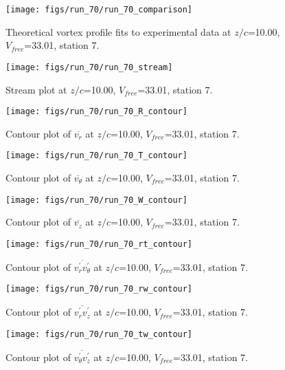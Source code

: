 \begin{figure}[H]
\centering
\texttt{[image: figs/run\_70/run\_70\_comparison]}
\caption{Theoretical vortex profile fits to experimental data at $z/c$=10.00, $V_{free}$=33.01, station 7.}
\end{figure}


\begin{figure}[H]
\centering
\texttt{[image: figs/run\_70/run\_70\_stream]}
\caption{Stream plot at $z/c$=10.00, $V_{free}$=33.01, station 7.}
\end{figure}


\begin{figure}[H]
\centering
\texttt{[image: figs/run\_70/run\_70\_R\_contour]}
\caption{Contour plot of $\overline{v_{r}}$ at $z/c$=10.00, $V_{free}$=33.01, station 7.}
\end{figure}


\begin{figure}[H]
\centering
\texttt{[image: figs/run\_70/run\_70\_T\_contour]}
\caption{Contour plot of $\overline{v_{\theta}}$ at $z/c$=10.00, $V_{free}$=33.01, station 7.}
\end{figure}


\begin{figure}[H]
\centering
\texttt{[image: figs/run\_70/run\_70\_W\_contour]}
\caption{Contour plot of $\overline{v_{z}}$ at $z/c$=10.00, $V_{free}$=33.01, station 7.}
\end{figure}


\begin{figure}[H]
\centering
\texttt{[image: figs/run\_70/run\_70\_rt\_contour]}
\caption{Contour plot of $\overline{v_{r}^{\prime} v_{\theta}^{\prime}}$ at $z/c$=10.00, $V_{free}$=33.01, station 7.}
\end{figure}


\begin{figure}[H]
\centering
\texttt{[image: figs/run\_70/run\_70\_rw\_contour]}
\caption{Contour plot of $\overline{v_{r}^{\prime} v_{z}^{\prime}}$ at $z/c$=10.00, $V_{free}$=33.01, station 7.}
\end{figure}


\begin{figure}[H]
\centering
\texttt{[image: figs/run\_70/run\_70\_tw\_contour]}
\caption{Contour plot of $\overline{v_{\theta}^{\prime} v_{z}^{\prime}}$ at $z/c$=10.00, $V_{free}$=33.01, station 7.}
\end{figure}


